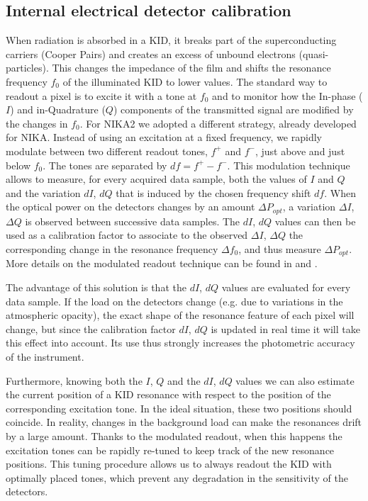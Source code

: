 \documentclass[]{aa} %
\begin{document}
\subsection{Internal electrical detector calibration}
\label{Internal detectors calibration}
When radiation is absorbed in a KID, it breaks part of the superconducting carriers (Cooper Pairs) and creates an excess of unbound electrons (quasi-particles). This changes the impedance of the film and shifts the resonance frequency $f_0$ of the illuminated KID to lower values.
The standard way to readout a pixel is to excite it with a tone at $f_0$ and to monitor how the In-phase ($I$) and in-Quadrature ($Q$) components of the transmitted signal are modified by the changes in $f_0$. For NIKA2 we adopted a different strategy, already developed for NIKA. Instead of using an excitation at a fixed frequency, we rapidly modulate between two different readout tones, $f^+$ and $f^-$, just above and just below $f_0$. The tones are separated by $df=f^+-f^-$. This modulation technique allows to measure, for every acquired data sample, both the values of $I$ and $Q$ and the variation $dI$, $dQ$ that is induced by the chosen frequency shift $df$. When the optical power on the detectors changes by an amount $\Delta P_{opt}$, a variation $\Delta I$, $\Delta Q$ is observed between successive data samples. The $dI$, $dQ$ values can then be used as a calibration factor to associate to the observed $\Delta I$, $\Delta Q$ the corresponding change in the resonance frequency $\Delta f_0$, and thus measure $\Delta P_{opt}$. More details on the modulated readout technique can be found in \cite{Calvo2013} and \cite{Catalano2014}.

The advantage of this solution is that the $dI$, $dQ$ values are evaluated for every data sample. If the load on the detectors change (e.g. due to variations in the atmospheric opacity), the exact shape of the resonance feature of each pixel will change, but since the calibration factor $dI$, $dQ$ is updated in real time it will take this effect into account. Its use thus strongly increases the photometric accuracy of the instrument.

Furthermore, knowing both the $I$, $Q$ and the $dI$, $dQ$ values we can also estimate the current position of a KID resonance with respect to the position of the corresponding excitation tone. In the ideal situation, these two positions should coincide. In reality, changes in the background load can make the resonances drift by a large amount. Thanks to the modulated readout, when this happens the excitation tones can be rapidly re-tuned to keep track of the new resonance positions. This tuning procedure allows us to always readout the KID with optimally placed tones, which prevent any degradation in the sensitivity of the detectors.
\end{document}
